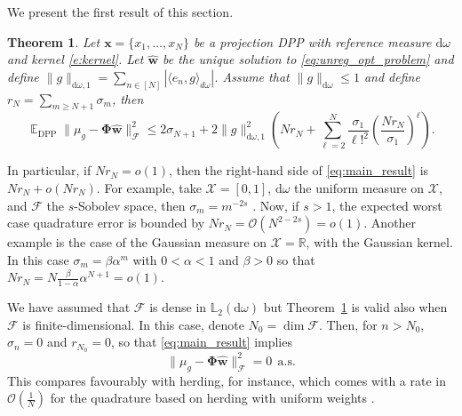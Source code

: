 \documentclass[twoside,11pt]{book}
\newtheorem{theorem}{Theorem}
\DeclareMathOperator{\DPP}{\mathrm{DPP}}
\DeclareMathOperator{\EX}{\mathbb{E}}
\begin{document}
We present the first result of this section.
\begin{theorem}\label{thm:main_theorem}
Let $\bm{x} = \{x_{1}, \dots , x_{N}\}$ be a projection DPP with reference measure $\mathrm{d}\omega$ and kernel \eqref{e:kernel}. Let $\hat{\bm{w}}$ be the unique solution to \eqref{eq:unreg_opt_problem} and define $\displaystyle \|g\|_{\mathrm{d}\omega,1} = \sum\limits_{n \in [N]} |\langle e_{n},g \rangle_{d\omega}|$. Assume that $\|g\|_{\mathrm{d}\omega} \leq 1$ and define $r_{N} = \sum\limits_{m \geq N+1} \sigma_{m}$, then
\begin{equation}\label{eq:main_result}
\EX_{\DPP} \|\mu_{g} - \bm{\Phi}\hat{\bm{w}}\|_{\mathcal{F}}^{2}  \leq
2\sigma_{N+1} +2\|g\|_{\mathrm{d}\omega,1}^{2}\left(   N r_{N} + \sum\limits_{\ell =2}^{N} \frac{\sigma_{1}}{\ell!^{2}}\left(\frac{Nr_{N}}{\sigma_{1}}\right)^{\ell} \right).
\end{equation}
\end{theorem}
In particular, if $Nr_{N} = o(1)$, then the right-hand side of \eqref{eq:main_result} is $N r_{N} + o(N r_{N})$. For example, take $\mathcal{X} = [0,1]$, $\mathrm{d}\omega$ the uniform measure on $\mathcal{X}$, and $\mathcal{F}$ the $s$-Sobolev space, then $\sigma_{m} = m^{-2s}$ \cite{BeTh11}. Now, if $s > 1$, the expected worst case quadrature error is bounded by $Nr_{N} = \mathcal{O}(N^{2-2s}) = o(1)$. Another example is the case of the Gaussian measure on $\mathcal{X} = \mathbb{R}$, with the Gaussian kernel. In this case $\sigma_{m} = \beta \alpha^{m}$ with $0 < \alpha < 1$ and $\beta >0$ \cite{RaWi06} so that $Nr_{N} = N\frac{\beta}{1-\alpha}\alpha^{N+1}=  o(1)$.


We have assumed that $\mathcal{F}$ is dense in $\mathbb{L}_{2}(\mathrm{d}\omega)$ but Theorem~\ref{thm:main_theorem} is valid also when $\mathcal{F}$ is finite-dimensional. In this case, denote $N_{0} = \dim \mathcal{F}$. Then, for $n > N_{0}$, $\sigma_{n} = 0$ and $r_{N_{0}} = 0$, so that \eqref{eq:main_result} implies
\begin{equation}
  \| \mu_{g} - \bm{\Phi}\hat{\bm{w}}\|_{\mathcal{F}}^{2} = 0 \:\: \text{a.s.}
\end{equation}
This compares favourably with herding, for instance, which comes with a rate in $\mathcal{O}(\frac{1}{N})$ for the quadrature based on herding with uniform weights \cite{BaLaOb12,ChWeSm10}.
\end{document}
